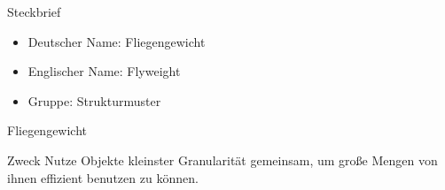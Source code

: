 \begin{frame}{Steckbrief}
	\begin{itemize}
 		\item Deutscher Name: Fliegengewicht
 		\item Englischer Name: Flyweight
 		\item Gruppe: Strukturmuster
 	\end{itemize}
\end{frame}

\begin{frame}{Fliegengewicht}
	\begin{block}{Zweck}
 		Nutze Objekte kleinster Granularität gemeinsam, um große Mengen von ihnen effizient benutzen zu können.
 	\end{block}
\end{frame}


